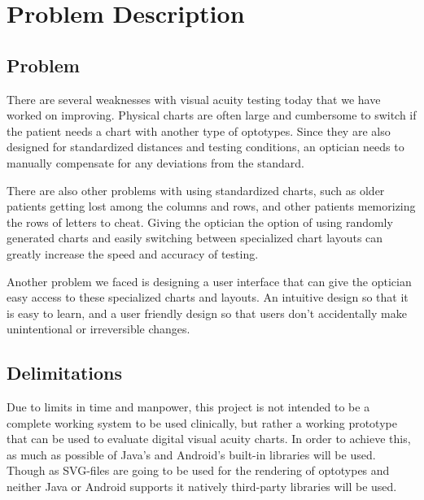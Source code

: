 \documentclass[12pt,a4paper,notitlepage]{report}
\begin{document}
\chapter{Problem Description}
\section{Problem}
There are several weaknesses with visual acuity testing today that we have worked on improving. Physical charts are often large and cumbersome to switch if the patient needs a chart with another type of optotypes. Since they are also designed for standardized distances and testing conditions, an optician needs to manually compensate for any deviations from the standard. 

There are also other problems with using standardized charts, such as older patients getting lost among the columns and rows, and other patients memorizing the rows of letters to cheat. Giving the optician the option of using randomly generated charts and easily switching between specialized chart layouts can greatly increase the speed and accuracy of testing.

Another problem we faced is designing a user interface that can give the optician easy access to these specialized charts and layouts. An intuitive design so that it is easy to learn, and a user friendly design so that users don't accidentally make unintentional or irreversible changes.

\section{Delimitations}
Due to limits in time and manpower, this project is not intended to be a complete working system to be used clinically, but rather a working prototype that can be used to evaluate digital visual acuity charts. In order to achieve this, as much as possible of Java's and Android's built-in libraries will be used. Though as SVG-files are going to be used for the rendering of optotypes and neither Java or Android supports it natively third-party libraries will be used.
\end{document}
